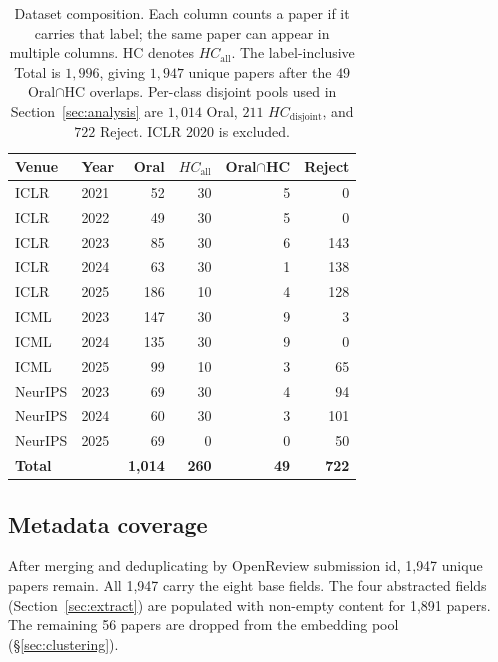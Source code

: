 \documentclass[10pt,a4paper]{article}
\begin{document}
\begin{table}[!htbp]
\centering
\caption{Dataset composition. Each column counts a paper if it carries that label; the same paper can appear in multiple columns. HC denotes \(HC_{\mathrm{all}}\). The label-inclusive Total is $1{,}996$, giving $1{,}947$ unique papers after the $49$ Oral$\cap$HC overlaps. Per-class disjoint pools used in Section~\ref{sec:analysis} are $1{,}014$ Oral, $211$ \(HC_{\mathrm{disjoint}}\), and $722$ Reject. ICLR 2020 is excluded.}
\label{tab:data}
\small
\begin{tabular}{llrrrr}
\toprule
\textbf{Venue} & \textbf{Year} & \textbf{\textcolor{cblue}{Oral}} & \textbf{\textcolor{cgold}{\(HC_{\mathrm{all}}\)}} & \textbf{Oral$\cap$HC} & \textbf{\textcolor{cred}{Reject}} \\
\midrule
ICLR    & 2021 &  52 & 30 & 5 &   0 \\
ICLR    & 2022 &  49 & 30 & 5 &   0 \\
ICLR    & 2023 &  85 & 30 & 6 & 143 \\
ICLR    & 2024 &  63 & 30 & 1 & 138 \\
ICLR    & 2025 & 186 & 10 & 4 & 128 \\
ICML    & 2023 & 147 & 30 & 9 &   3 \\
ICML    & 2024 & 135 & 30 & 9 &   0 \\
ICML    & 2025 &  99 & 10 & 3 &  65 \\
NeurIPS & 2023 &  69 & 30 & 4 &  94 \\
NeurIPS & 2024 &  60 & 30 & 3 & 101 \\
NeurIPS & 2025 &  69 &  0 & 0 &  50 \\
\midrule
\textbf{Total} &  & \textbf{1{,}014} & \textbf{260} & \textbf{49} & \textbf{722} \\
\bottomrule
\end{tabular}
\end{table}

\subsection{Metadata coverage}
\label{subsec:meta-coverage}

After merging and deduplicating by OpenReview submission id, 1{,}947 unique papers remain. All 1{,}947 carry the eight base fields. The four abstracted fields (Section~\ref{sec:extract}) are populated with non-empty content for 1{,}891 papers. The remaining 56 papers are dropped from the embedding pool (\S\ref{sec:clustering}).
\end{document}
